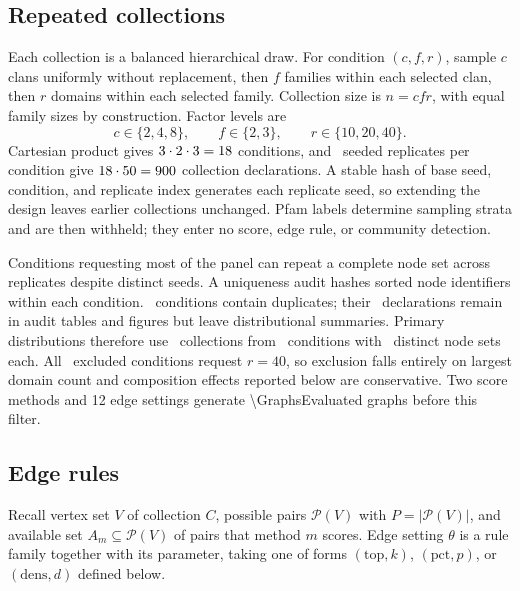 \documentclass[11pt,a4paper]{article}
\begin{document}
\subsection{Repeated collections}

Each collection is a balanced hierarchical draw. For condition \((c,f,r)\),
sample \(c\) clans uniformly without replacement, then \(f\) families within
each selected clan, then \(r\) domains within each selected family. Collection
size is \(n=cfr\), with equal family sizes by construction. Factor levels are
\[
c\in\{2,4,8\},\qquad f\in\{2,3\},\qquad r\in\{10,20,40\}.
\]
Cartesian product gives \(3\cdot2\cdot3=18\) conditions, and
\ReplicatesPerCondition\ seeded replicates per condition give
\(18\cdot50=900\) collection
declarations. A stable hash of base seed, condition, and replicate index
generates each replicate seed, so extending the design leaves earlier
collections unchanged. Pfam labels determine sampling strata and are then
withheld; they enter no score, edge rule, or community detection.

Conditions requesting most of the panel can repeat a complete node set across
replicates despite distinct seeds. A uniqueness audit hashes sorted node
identifiers within each condition. \ExcludedCells\ conditions contain
duplicates; their \ExcludedCollections\ declarations remain in audit tables and
figures but leave distributional summaries. Primary distributions therefore use
\PrimaryCollections\ collections from \PrimaryConditions\ conditions with
\ReplicatesPerCondition\ distinct node sets each. All \ExcludedCells\ excluded
conditions request \(r=40\), so exclusion falls entirely on largest domain
count and composition effects reported below are conservative. Two score
methods and 12 edge settings generate \num{\GraphsEvaluated} graphs before this
filter.

\subsection{Edge rules}
\label{sec:rules}

Recall vertex set \(V\) of collection \(C\), possible pairs \(\mathcal P(V)\)
with \(P=\lvert\mathcal P(V)\rvert\), and available set
\(A_m\subseteq\mathcal P(V)\) of pairs that method \(m\) scores. Edge setting
\(\theta\) is a rule family together with its parameter, taking one of forms
\((\mathrm{top},k)\), \((\mathrm{pct},p)\), or \((\mathrm{dens},d)\) defined
below.
\end{document}
